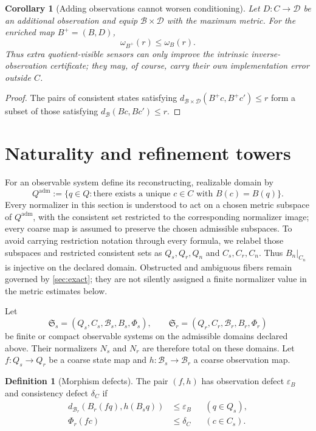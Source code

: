 \documentclass[11pt]{article}
\newtheorem{corollary}[theorem]{Corollary}
\theoremstyle{definition}
\newtheorem{definition}[theorem]{Definition}
\theoremstyle{remark}
\numberwithin{equation}{section}
\newcommand{\cB}{\mathcal B}
\newcommand{\eps}{\varepsilon}
\begin{document}
\begin{corollary}[Adding observations cannot worsen conditioning]\label{cor:sensor-enrichment}
Let $D:C\to\mathcal D$ be an additional observation and equip
$\cB\times\mathcal D$ with the maximum metric.  For the enriched map
$B^+=(B,D)$,
\[
 \omega_{B^+}(r)\le\omega_B(r).
\]
Thus extra quotient-visible sensors can only improve the intrinsic inverse-observation certificate; they may, of course, carry their own implementation error outside $C$.
\end{corollary}

\begin{proof}
The pairs of consistent states satisfying
$d_{\cB\times\mathcal D}(B^+c,B^+c')\le r$ form a subset of those satisfying
$d_{\cB}(Bc,Bc')\le r$.
\end{proof}

\section{Naturality and refinement towers}\label{sec:refinement}

For an observable system define its reconstructing, realizable domain by
\[
 Q^{\mathrm{adm}}
 :=
 \{q\in Q:\text{there exists a unique }c\in C
              \text{ with }B(c)=B(q)\}.
\]
Every normalizer in this section is understood to act on a chosen metric
subspace of $Q^{\mathrm{adm}}$, with the consistent set restricted to the
corresponding normalizer image; every coarse map is assumed to preserve the
chosen admissible subspaces.  To avoid carrying restriction notation through
every formula, we relabel those subspaces and restricted consistent sets as
$Q_s,Q_r,Q_n$ and $C_s,C_r,C_n$.  Thus $B_n|_{C_n}$ is injective on the
declared domain.  Obstructed and ambiguous fibers remain governed by
\cref{sec:exact}; they are not silently assigned a finite normalizer value in
the metric estimates below.

Let
\[
 \mathfrak S_s=(Q_s,C_s,\cB_s,B_s,\Phi_s),
 \qquad
 \mathfrak S_r=(Q_r,C_r,\cB_r,B_r,\Phi_r)
\]
be finite or compact observable systems on the admissible domains declared
above.  Their normalizers $N_s$ and $N_r$ are therefore total on these
domains.  Let $f:Q_s\to Q_r$ be a coarse state map and
$h:\cB_s\to\cB_r$ a coarse observation map.

\begin{definition}[Morphism defects]
The pair $(f,h)$ has observation defect $\eps_B$ and consistency defect $\delta_C$ if
\begin{align}
 d_{\cB_r}(B_r(fq),h(B_s q))&\le\eps_B &&(q\in Q_s),\label{eq:obs-defect}\\
 \Phi_r(fc)&\le\delta_C &&(c\in C_s).\label{eq:cons-defect}
\end{align}
\end{definition}
\end{document}
